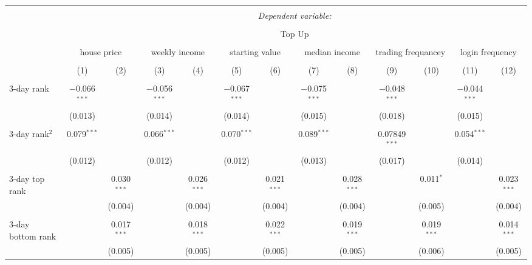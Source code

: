




\begin{tabular}{@{\extracolsep{2pt}}lcccccccccccc} 
		\\[-1.8ex]\hline 
\hline \\[-1.8ex] 
& \multicolumn{12}{c}{\textit{Dependent variable:}} \\ 
\cline{2-13} 
\\[-1.8ex] & \multicolumn{12}{c}{Top Up} \\ 
\\[-1.8ex] & \multicolumn{2}{c}{house price}& \multicolumn{2}{c}{weekly income}& \multicolumn{2}{c}{starting value}& \multicolumn{2}{c}{median income}& \multicolumn{2}{c}{trading frequancey} & \multicolumn{2}{c}{login frequency}\\
\cmidrule(lr){2-3}
\cmidrule(lr){4-5}
\cmidrule(lr){6-7}
\cmidrule(lr){8-9}
\cmidrule(lr){10-11}
\cmidrule(lr){12-13}
\\[-1.8ex] & (1) & (2) & (3) & (4)& (5) & (6) & (7) & (8)& (9) & (10) & (11) & (12)\\ 
\hline \\[-1.8ex] 
3-day rank & $-$0.066$^{***}$ &  & $-$0.056$^{***}$ &  & $-$0.067$^{***}$ &  & $-$0.075$^{***}$ &  & $-$0.048$^{***}$ &  & $-$0.044$^{***}$ &  \\ 
& (0.013) &  & (0.014) &  & (0.014) &  & (0.015) &  & (0.018) &  & (0.015) &  \\ 
& & & & & & & & & & & & \\ 
3-day rank$^2$ & 0.079$^{***}$ &  & 0.066$^{***}$ &  & 0.070$^{***}$ &  & 0.089$^{***}$ &  & 0.07849$^{***}$ &  & 0.054$^{***}$ &  \\ 
& (0.012) &  & (0.012) &  & (0.012) &  & (0.013) &  & (0.017) &  & (0.014) &  \\ 
& & & & & & & & & & & & \\ 
3-day top rank &  & 0.030$^{***}$ &  & 0.026$^{***}$ &  & 0.021$^{***}$ &  & 0.028$^{***}$ &  & 0.011$^{*}$ &  & 0.023$^{***}$ \\ 
&  & (0.004) &  & (0.004) &  & (0.004) &  & (0.004) &  & (0.005) &  & (0.004) \\ 
& & & & & & & & & & & & \\ 
3-day bottom rank &  & 0.017$^{***}$ &  & 0.018$^{***}$ &  & 0.022$^{***}$ &  & 0.019$^{***}$ &  & 0.019$^{***}$ &  & 0.014$^{***}$ \\ 
&  & (0.005) &  & (0.005) &  & (0.005) &  & (0.005) &  & (0.006) &  & (0.005) \\ 

\end{tabular}
